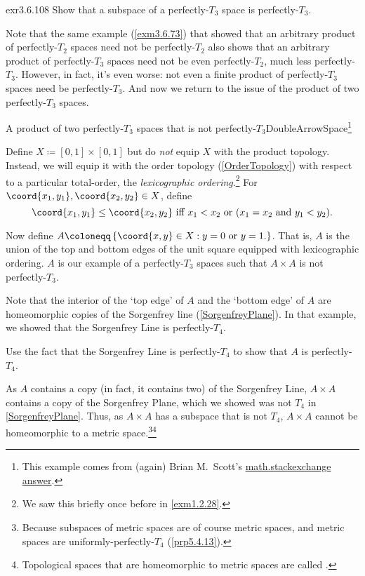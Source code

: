 \begin{exr}{}{exr3.6.108}
Show that a subspace of a perfectly-$T_3$ space is perfectly-$T_3$.
\end{exr}
Note that the same example (\cref{exm3.6.73}) that showed that an arbitrary product of perfectly-$T_2$ spaces need not be perfectly-$T_2$ also shows that an arbitrary product of perfectly-$T_3$ spaces need not be even perfectly-$T_2$, much less perfectly-$T_3$.  However, in fact, it's even worse:  not even a finite product of perfectly-$T_3$ spaces need be perfectly-$T_3$.
And now we return to the issue of the product of two perfectly-$T_3$ spaces.
\begin{exm}{A product of two perfectly-$T_3$ spaces that is not perfectly-$T_3$}{DoubleArrowSpace}\footnote{This example comes from (again) Brian M.~Scott's \href{http://math.stackexchange.com/questions/1859028/}{math.stackexchange answer}.}
\forwardref

\noindent
Define $X\coloneqq [0,1]\times [0,1]$ but do \emph{not} equip $X$ with the product topology.  Instead, we will equip it with the order topology (\cref{OrderTopology}) with respect to a particular total-order, the \emph{lexicographic ordering}.\footnote{We saw this briefly once before in \cref{exm1.2.28}.}  For $\coord{x_1,y_1},\coord{x_2,y_2}\in X$, define
\begin{equation*}
\coord{x_1,y_1}\leq \coord{x_2,y_2}\text{ iff }x_1<x_2\text{ or }(x_1=x_2\text{ and }y_1<y_2).
\end{equation*}

Now define $A\coloneqq \left\{ \coord{x,y}\in X:y=0\text{ or }y=1\text{.}\right\}$.  That is, $A$ is the union of the top and bottom edges of the unit square equipped with lexicographic ordering.  $A$ is our example of a perfectly-$T_3$ spaces such that $A\times A$ is not perfectly-$T_3$.

Note that the interior of the `top edge' of $A$ and the `bottom edge' of $A$ are homeomorphic copies of the Sorgenfrey line (\cref{SorgenfreyPlane}).  In that example, we showed that the Sorgenfrey Line is perfectly-$T_4$.
\begin{exr}{}{}
Use the fact that the Sorgenfrey Line is perfectly-$T_4$ to show that $A$ is perfectly-$T_4$.
\end{exr}

As $A$ contains a copy (in fact, it contains two) of the Sorgenfrey Line, $A\times A$ contains a copy of the Sorgenfrey Plane, which we showed was not $T_4$ in \cref{SorgenfreyPlane}.  Thus, as $A\times A$ has a subspace that is not $T_4$, $A\times A$ cannot be homeomorphic to a metric space.\footnote{Because subspaces of metric spaces are of course metric spaces, and metric spaces are uniformly-perfectly-$T_4$ (\cref{prp5.4.13}).}\footnote{Topological spaces that are homeomorphic to metric spaces are called .}


\end{exm}
